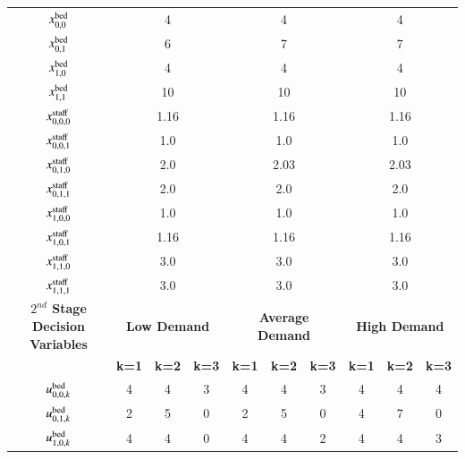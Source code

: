 \documentclass[../thesis.tex]{subfiles}
\begin{document}
{\begin{landscape}
\begin{table}[h!]
\begin{tabular}{cccccccccc}
    $x^\textnormal{bed}_{0,0}$        &\multicolumn{3}{c}{4}  &\multicolumn{3}{c}{4}    &\multicolumn{3}{c}{4}    \\
    $x^\textnormal{bed}_{0,1}$        &\multicolumn{3}{c}{6}  &\multicolumn{3}{c}{7}    &\multicolumn{3}{c}{7}    \\
    $x^\textnormal{bed}_{1,0}$        &\multicolumn{3}{c}{4}  &\multicolumn{3}{c}{4}    &\multicolumn{3}{c}{4}    \\
    $x^\textnormal{bed}_{1,1}$        &\multicolumn{3}{c}{10} &\multicolumn{3}{c}{10}   &\multicolumn{3}{c}{10}   \\ \midrule
    $x^\textnormal{staff}_{0,0,0}$    &\multicolumn{3}{c}{1.16} &\multicolumn{3}{c}{1.16} &\multicolumn{3}{c}{1.16} \\
    $x^\textnormal{staff}_{0,0,1}$    &\multicolumn{3}{c}{1.0}  &\multicolumn{3}{c}{1.0}  &\multicolumn{3}{c}{1.0}  \\
    $x^\textnormal{staff}_{0,1,0}$    &\multicolumn{3}{c}{2.0}  &\multicolumn{3}{c}{2.03} &\multicolumn{3}{c}{2.03} \\
    $x^\textnormal{staff}_{0,1,1}$    &\multicolumn{3}{c}{2.0}  &\multicolumn{3}{c}{2.0}  &\multicolumn{3}{c}{2.0}  \\
    $x^\textnormal{staff}_{1,0,0}$    &\multicolumn{3}{c}{1.0}  &\multicolumn{3}{c}{1.0}  &\multicolumn{3}{c}{1.0}  \\
    $x^\textnormal{staff}_{1,0,1}$    &\multicolumn{3}{c}{1.16} &\multicolumn{3}{c}{1.16} & \multicolumn{3}{c}{1.16}\\
    $x^\textnormal{staff}_{1,1,0}$    &\multicolumn{3}{c}{3.0}  &\multicolumn{3}{c}{3.0}  &\multicolumn{3}{c}{3.0}  \\
    $x^\textnormal{staff}_{1,1,1}$    &\multicolumn{3}{c}{3.0}  &\multicolumn{3}{c}{3.0}  & \multicolumn{3}{c}{3.0} \\ \midrule
     \textbf{$2^{nd}$ Stage Decision Variables} & \multicolumn{3}{c}{\textbf{Low Demand}} & \multicolumn{3}{c}{\textbf{Average Demand}} & \multicolumn{3}{c}{\textbf{High Demand}} \\
     & \textbf{k=1} & \textbf{k=2} & \textbf{k=3}& \textbf{k=1} & \textbf{k=2} & \textbf{k=3}& \textbf{k=1} & \textbf{k=2} & \textbf{k=3}\\
     \midrule
    $u^\textnormal{bed}_{0,0,k}$     & 4  & 4  & 3  & 4  & 4  & 3  & 4  & 4  & 4  \\
    $u^\textnormal{bed}_{0,1,k}$     & 2  & 5  & 0  & 2  & 5  & 0  & 4  & 7  & 0  \\
    $u^\textnormal{bed}_{1,0,k}$     & 4  & 4  & 0  & 4  & 4  & 2  & 4  & 4  & 3  \\

\end{tabular}
\end{table}
\end{landscape}}
\end{document}
